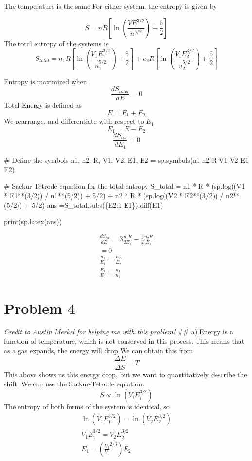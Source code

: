 \documentclass[]{article}
\newenvironment{Shaded}{\begin{snugshade}}{\end{snugshade}}
\newcommand{\NormalTok}[1]{#1}
\begin{document}
The temperature is the same For either system, the entropy is given by

\[
S = nR \left[ \ln \left( \frac{V E^{3/2}}{n^{5/2}} \right) + \frac{5}{2} \right]
\] The total entropy of the systems is \[
S_{total} = n_{1}R \left[ \ln \left( \frac{V_{1} E_{1}^{3/2}}{n_{1}^{5/2}} \right) + \frac{5}{2} \right]+n_{2}R \left[ \ln \left( \frac{V_{1} E_{2}^{3/2}}{n_{2}^{5/2}} \right) + \frac{5}{2} \right]
\]

Entropy is maximized when \[
\frac{dS_{total}}{dE}=0
\] Total Energy is defined as \[
E= E_{1}+E_{2}
\] We rearrange, and differentiate with respect to \(E_{1}\) \[
E_{1} = E-E_{2}
\] \[
\frac{dS_{tot}}{dE_{1}} = 0
\]

\begin{Shaded}
\begin{Highlighting}[]
\NormalTok{\# Define the symbols}
\NormalTok{n1, n2, R, V1, V2, E1, E2 = sp.symbols(\textquotesingle{}n1 n2 R V1 V2 E1 E2\textquotesingle{})}

\NormalTok{\# Sackur{-}Tetrode equation for the total entropy}
\NormalTok{S\_total = n1 * R * (sp.log((V1 * E1**(3/2)) / n1**(5/2)) + 5/2) + n2 * R * (sp.log((V2 * E2**(3/2)) / n2**(5/2)) + 5/2)}
\NormalTok{ans =S\_total.subs(\{E2:1{-}E1\}).diff(E1)}

\NormalTok{print(sp.latex(ans))}
\end{Highlighting}
\end{Shaded}

\[
\begin{align}
\frac{dS_{tot}}{dE_{1}}  =3\frac{n_{1}R}{2E_{1}}- \frac{3}{2}\frac{n_{2}R}{E_{1}} \\
=0 \\
\frac{n_{1}}{E_{1}}=\frac{n_{2}}{E_{2}} \\
\frac{E_{1}}{E_{2}} = \frac{n_{1}}{n_{2}}
\end{align}
\]

\hypertarget{problem-4}{%
\section{Problem 4}\label{problem-4}}

\emph{Credit to Austin Merkel for helping me with this problem!} \#\# a)
Energy is a function of temperature, which is not conserved in this
process. This means that as a gas expands, the energy will drop We can
obtain this from \[
\frac{\Delta E}{\Delta S} = T
\] This above shows us this energy drop, but we want to quantitatively
describe the shift. We can use the Sackur-Tetrode equation. \[
S\propto \ln(V_{i}E_{i}^{3/2})
\] The entropy of both forms of the system is identical, so \[
\begin{align}
\ln(V_{1}E_{1}^{3/2}) = \ln(V_{2}E_{2}^{3/2}) \\
V_{1}E_{1}^{3/2} = V_{2}E_{2}^{3/2} \\
E_{1} = \left( \frac{V_{2}}{V_{1}}^{2/3} \right)E_{2}
\end{align}
\]
\end{document}
